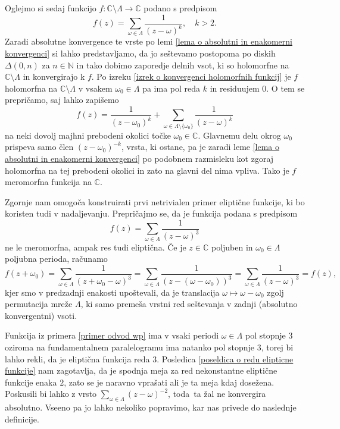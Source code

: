 \documentclass[mat1]{fmfdelo}
\numberwithin{equation}{section}
\newcommand{\N}{\mathbb N}
\newcommand{\C}{\mathbb C}
\newcommand{\om}{\omega}
\newcommand{\disk}[2]{\Delta(#1, #2)}
\theoremstyle{definition}
\begin{document}
\begin{dokaz}
    \cite[\S 5, Theorem 1]{Ahlfors}
\end{dokaz}
    
Oglejmo si sedaj funkcijo $f:\C\setminus\Lambda \to \C$ podano s predpisom
\[
    f(z) = \sum_{\om \in \Lambda} \frac{1}{(z - \om)^k}, \quad k > 2.
\]
Zaradi absolutne konvergence te vrste po lemi \ref{lema o absolutni in enakomerni konvergenci} si lahko predstavljamo, da jo seštevamo postopoma po diskih $\disk{0}{n}$ za $n\in\N$ in tako dobimo zaporedje delnih vsot, ki so holomorfne na $\C\setminus\Lambda$ in konvergirajo k $f$. Po izreku \ref{izrek o konvergenci holomorfnih funkcij} je $f$ holomorfna na $\C \setminus \Lambda$ v vsakem $\om_0 \in \Lambda$ pa ima pol reda $k$ in residuujem $0$. O tem se prepričamo, saj lahko zapišemo
\[
    f(z) = \frac{1}{(z-\om_0)^k} + \sum_{\om \in \Lambda \setminus \{\om_0\}} \frac{1}{(z - \om)^k}
\]
na neki dovolj majhni prebodeni okolici točke $\om_0\in \C$. Glavnemu delu okrog $\om_0$ prispeva samo člen $(z - \om_0)^{-k}$, vrsta, ki ostane, pa je zaradi leme \ref{lema o absolutni in enakomerni konvergenci} po podobnem razmisleku kot zgoraj holomorfna na tej prebodeni okolici in zato na glavni del nima vpliva. Tako je $f$ meromorfna funkcija na $\C$. 

\begin{primer*}
    \label{primer odvod wp}
    Zgornje nam omogoča konstruirati prvi netrivialen primer eliptične funkcije, ki bo koristen tudi v nadaljevanju. Prepričajmo se, da je funkcija podana s predpisom
    \[
        f(z) = \sum_{\om \in \Lambda} \frac{1}{(z - \om)^3}
    \]
    ne le meromorfna, ampak res tudi eliptična. Če je $z \in \C$ poljuben in $\om_0 \in \Lambda$ poljubna perioda, računamo
    \[
        f(z + \om_0) = 
        \sum_{\om \in \Lambda} \frac{1}{(z + \om_0 - \om)^3} = 
        \sum_{\om \in \Lambda} \frac{1}{(z - (\om - \om_0))^3} = 
        \sum_{\om \in \Lambda} \frac{1}{(z - \om)^3} = 
        f(z),
    \]
    kjer smo v predzadnji enakosti upoštevali, da je translacija $\om \mapsto \om - \om_0$ zgolj permutacija mreže $\Lambda$, ki samo premeša vrstni red seštevanja v zadnji (absolutno konvergentni) vsoti. 
\end{primer*}

Funkcija iz primera \ref{primer odvod wp} ima v vsaki periodi $\om\in \Lambda$ pol stopnje $3$ oziroma na fundamentalnem paralelogramu ima natanko pol stopnje $3$, torej bi lahko rekli, da je eliptična funkcija reda $3$. Posledica \ref{poseldica o redu elipticne funkcije} nam zagotavlja, da je spodnja meja za red nekonstantne eliptične funkcije enaka $2$, zato se je naravno vprašati ali je ta meja kdaj dosežena. Poskusili bi lahko z vrsto $\sum_{\om\in\Lambda}(z - \om)^{-2}$, toda ta žal ne konvergira absolutno. Vseeno pa jo lahko nekoliko popravimo, kar nas privede do naslednje definicije. 
\end{document}
